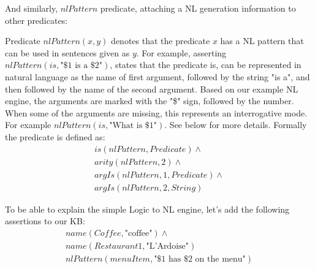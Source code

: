 And similarly, $nlPattern$ predicate, attaching a NL generation information to 
other predicates:

\begin{definition}\label{def:predNlPattern}
Predicate $nlPattern(x,y)$ denotes that the predicate $x$ has a NL pattern
that can be used in sentences given as $y$. For example, asserting 
$nlPattern(is,\text{"\$1 is a \$2"})$, states that the predicate is, can
be represented in natural language as the name of first argument, followed by
the string "is a", and then followed by the name of the second argument. Based
on our example NL engine, the arguments are marked with the "\$" sign, followed
by the number. When some of the arguments are missing, this represents an 
interrogative mode. For example $nlPattern(is,\text{"What is \$1"})$. See below
for more details. Formally the predicate is defined as:
\begin{equation}\label{as:predNL}
\begin{gathered}
	is(nlPattern,Predicate)\land\\
	arity(nlPattern,2)\land\\
	argIs(nlPattern,1,Predicate)\land\\
	argIs(nlPattern,2,String)
\end{gathered}
\end{equation}
\end{definition}

To be able to explain the simple Logic to NL engine, let's add the following 
assertions to our KB:
\begin{equation}\label{as:menuitem1}
\begin{gathered}
	name(Coffee,\text{"coffee"})\land\\
	name(Restaurant1, \text{"L'Ardoise"})\\
	nlPattern(menuItem, \text{"\$1 has \$2 on the menu"})
\end{gathered}
\end{equation}

